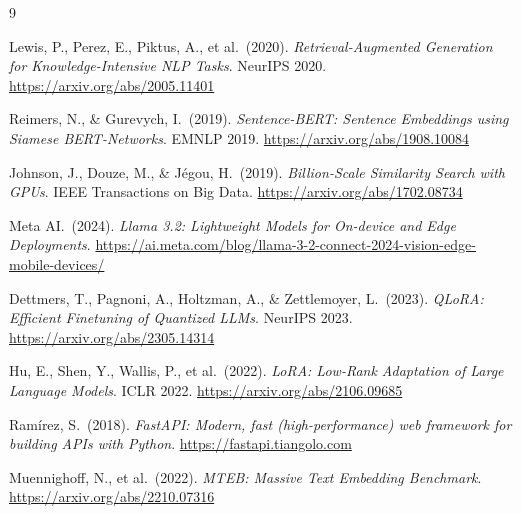 \documentclass[12pt,a4paper]{article}
\begin{document}
\begin{thebibliography}{9}

Lewis, P., Perez, E., Piktus, A., et al.\ (2020).
\textit{Retrieval-Augmented Generation for Knowledge-Intensive NLP Tasks}.
NeurIPS 2020.
\url{https://arxiv.org/abs/2005.11401}

Reimers, N., \& Gurevych, I.\ (2019).
\textit{Sentence-BERT: Sentence Embeddings using Siamese BERT-Networks}.
EMNLP 2019.
\url{https://arxiv.org/abs/1908.10084}

Johnson, J., Douze, M., \& J{\'e}gou, H.\ (2019).
\textit{Billion-Scale Similarity Search with GPUs}.
IEEE Transactions on Big Data.
\url{https://arxiv.org/abs/1702.08734}

Meta AI.\ (2024).
\textit{Llama 3.2: Lightweight Models for On-device and Edge Deployments}.
\url{https://ai.meta.com/blog/llama-3-2-connect-2024-vision-edge-mobile-devices/}

Dettmers, T., Pagnoni, A., Holtzman, A., \& Zettlemoyer, L.\ (2023).
\textit{QLoRA: Efficient Finetuning of Quantized LLMs}.
NeurIPS 2023.
\url{https://arxiv.org/abs/2305.14314}

Hu, E., Shen, Y., Wallis, P., et al.\ (2022).
\textit{LoRA: Low-Rank Adaptation of Large Language Models}.
ICLR 2022.
\url{https://arxiv.org/abs/2106.09685}

Ram{\'i}rez, S.\ (2018).
\textit{FastAPI: Modern, fast (high-performance) web framework for building APIs with Python}.
\url{https://fastapi.tiangolo.com}

Muennighoff, N., et al.\ (2022).
\textit{MTEB: Massive Text Embedding Benchmark}.
\url{https://arxiv.org/abs/2210.07316}

\end{thebibliography}
\end{document}
